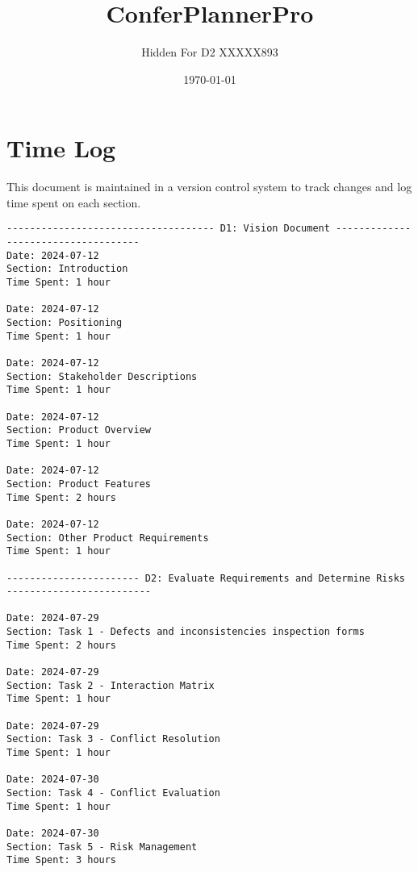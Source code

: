 \documentclass{article}
\begin{document}
\title{ConferPlannerPro}
\author{Hidden For D2 XXXXX893}
\date{\today}
\maketitle

\section{Time Log}
This document is maintained in a version control system to track changes and log time spent on each section.
\begin{verbatim}
------------------------------------ D1: Vision Document ------------------------------------
Date: 2024-07-12
Section: Introduction
Time Spent: 1 hour

Date: 2024-07-12
Section: Positioning
Time Spent: 1 hour

Date: 2024-07-12
Section: Stakeholder Descriptions
Time Spent: 1 hour

Date: 2024-07-12
Section: Product Overview
Time Spent: 1 hour

Date: 2024-07-12
Section: Product Features
Time Spent: 2 hours

Date: 2024-07-12
Section: Other Product Requirements
Time Spent: 1 hour

----------------------- D2: Evaluate Requirements and Determine Risks -------------------------

Date: 2024-07-29
Section: Task 1 - Defects and inconsistencies inspection forms
Time Spent: 2 hours

Date: 2024-07-29
Section: Task 2 - Interaction Matrix
Time Spent: 1 hour

Date: 2024-07-29
Section: Task 3 - Conflict Resolution
Time Spent: 1 hour

Date: 2024-07-30
Section: Task 4 - Conflict Evaluation
Time Spent: 1 hour

Date: 2024-07-30
Section: Task 5 - Risk Management
Time Spent: 3 hours



\end{verbatim}

\end{document}
